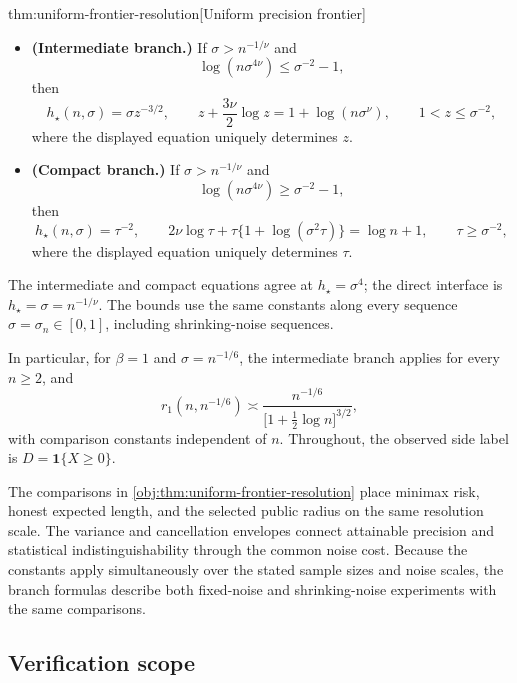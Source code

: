 \documentclass[11pt]{article}
\begin{document}
\begin{propositionv}{thm:uniform-frontier-resolution}[Uniform precision frontier]
\begin{itemize}
\item \textbf{(Intermediate branch.)}
If \(\sigma>n^{-1/\nu}\) and
\[
\log(n\sigma^{4\nu})\le \sigma^{-2}-1,
\]
then
\[
h_\star(n,\sigma)=\sigma z^{-3/2},
\qquad
z+\frac{3\nu}{2}\log z=1+\log(n\sigma^\nu),
\qquad
1<z\le\sigma^{-2},
\]
where the displayed equation uniquely determines \(z\).

\item \textbf{(Compact branch.)}
If \(\sigma>n^{-1/\nu}\) and
\[
\log(n\sigma^{4\nu})\ge \sigma^{-2}-1,
\]
then
\[
h_\star(n,\sigma)=\tau^{-2},
\qquad
2\nu\log\tau+
\tau\bigl\{1+\log(\sigma^2\tau)\bigr\}=\log n+1,
\qquad
\tau\ge\sigma^{-2},
\]
where the displayed equation uniquely determines \(\tau\).
\end{itemize}
The intermediate and compact equations agree at
\(h_\star=\sigma^4\); the direct interface is
\(h_\star=\sigma=n^{-1/\nu}\). The bounds use the same constants along every sequence \(\sigma=\sigma_n\in[0,1]\), including shrinking-noise sequences.

In particular, for \(\beta=1\) and \(\sigma=n^{-1/6}\), the intermediate branch applies for every \(n\ge2\), and
\[
r_1(n,n^{-1/6})
\asymp
\frac{n^{-1/6}}{\bigl[1+\tfrac12\log n\bigr]^{3/2}},
\]
with comparison constants independent of \(n\). Throughout, the observed side label is \(D=\mathbf1\{X\ge0\}\).
\end{propositionv}

The comparisons in \cref{obj:thm:uniform-frontier-resolution} place minimax risk, honest expected length, and the selected public radius on the same resolution scale. The variance and cancellation envelopes connect attainable precision and statistical indistinguishability through the common noise cost. Because the constants apply simultaneously over the stated sample sizes and noise scales, the branch formulas describe both fixed-noise and shrinking-noise experiments with the same comparisons.

\subsection{Verification scope}
\end{document}
